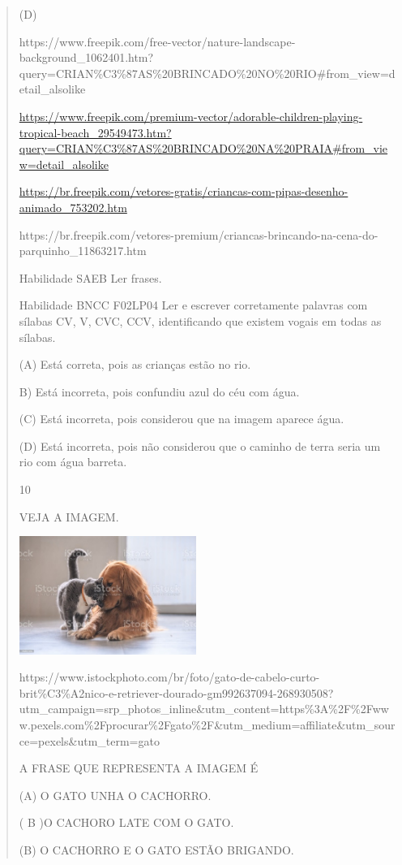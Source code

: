 {{{{\begin{verse}
{{\begin{escolha}
{{{{{(D)

https://www.freepik.com/free-vector/nature-landscape-background\_1062401.htm?query=CRIAN\%C3\%87AS\%20BRINCADO\%20NO\%20RIO\#from\_view=detail\_alsolike

\url{https://www.freepik.com/premium-vector/adorable-children-playing-tropical-beach_29549473.htm?query=CRIAN\%C3\%87AS\%20BRINCADO\%20NA\%20PRAIA\#from_view=detail_alsolike}

\url{https://br.freepik.com/vetores-gratis/criancas-com-pipas-desenho-animado_753202.htm}

https://br.freepik.com/vetores-premium/criancas-brincando-na-cena-do-parquinho\_11863217.htm

Habilidade SAEB Ler frases.

Habilidade BNCC F02LP04 Ler e escrever corretamente palavras com sílabas
CV, V, CVC, CCV, identificando que existem vogais em todas as sílabas.

(A) Está correta, pois as crianças estão no rio.

B) Está incorreta, pois confundiu azul do céu com água.

(C) Está incorreta, pois considerou que na imagem aparece água.

(D) Está incorreta, pois não considerou que o caminho de terra seria um
rio com água barreta.

\num{10}

VEJA A IMAGEM.

\includegraphics[width=2.27539in,height=1.51515in]{media/image158.jpeg}

https://www.istockphoto.com/br/foto/gato-de-cabelo-curto-brit\%C3\%A2nico-e-retriever-dourado-gm992637094-268930508?utm\_campaign=srp\_photos\_inline\&utm\_content=https\%3A\%2F\%2Fwww.pexels.com\%2Fprocurar\%2Fgato\%2F\&utm\_medium=affiliate\&utm\_source=pexels\&utm\_term=gato

A FRASE QUE REPRESENTA A IMAGEM É

(A) O GATO UNHA O CACHORRO.

( B )O CACHORO LATE COM O GATO.

(B) O CACHORRO E O GATO ESTÃO BRIGANDO.

}}}}}
\end{escolha}}}
\end{verse}}}}}
